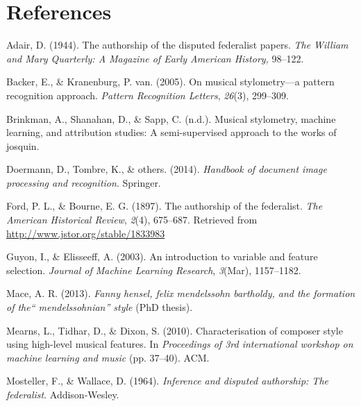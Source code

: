 \documentclass[12pt,twoside]{reedthesis}
\theoremstyle{definition}
\theoremstyle{definition}
\theoremstyle{definition}
\theoremstyle{remark}
\begin{document}
\backmatter

\chapter*{References}\label{references}


\noindent

\setlength{\parindent}{-0.20in} \setlength{\leftskip}{0.20in}
\setlength{\parskip}{8pt}

\hypertarget{refs}{}
\hypertarget{ref-adair1944}{}
Adair, D. (1944). The authorship of the disputed federalist papers.
\emph{The William and Mary Quarterly: A Magazine of Early American
History,} 98--122.

\hypertarget{ref-backer2005}{}
Backer, E., \& Kranenburg, P. van. (2005). On musical stylometry---a
pattern recognition approach. \emph{Pattern Recognition Letters},
\emph{26}(3), 299--309.

\hypertarget{ref-brinkman2016}{}
Brinkman, A., Shanahan, D., \& Sapp, C. (n.d.). Musical stylometry,
machine learning, and attribution studies: A semi-supervised approach to
the works of josquin.

\hypertarget{ref-OMR}{}
Doermann, D., Tombre, K., \& others. (2014). \emph{Handbook of document
image processing and recognition}. Springer.

\hypertarget{ref-authorshipfed}{}
Ford, P. L., \& Bourne, E. G. (1897). The authorship of the federalist.
\emph{The American Historical Review}, \emph{2}(4), 675--687. Retrieved
from \url{http://www.jstor.org/stable/1833983}

\hypertarget{ref-guyon2003}{}
Guyon, I., \& Elisseeff, A. (2003). An introduction to variable and
feature selection. \emph{Journal of Machine Learning Research},
\emph{3}(Mar), 1157--1182.

\hypertarget{ref-mace2013}{}
Mace, A. R. (2013). \emph{Fanny hensel, felix mendelssohn bartholdy, and
the formation of the`` mendelssohnian'' style} (PhD thesis).

\hypertarget{ref-mearns2010}{}
Mearns, L., Tidhar, D., \& Dixon, S. (2010). Characterisation of
composer style using high-level musical features. In \emph{Proceedings
of 3rd international workshop on machine learning and music} (pp.
37--40). ACM.

\hypertarget{ref-mosteller1964inference}{}
Mosteller, F., \& Wallace, D. (1964). \emph{Inference and disputed
authorship: The federalist}. Addison-Wesley.
\end{document}
